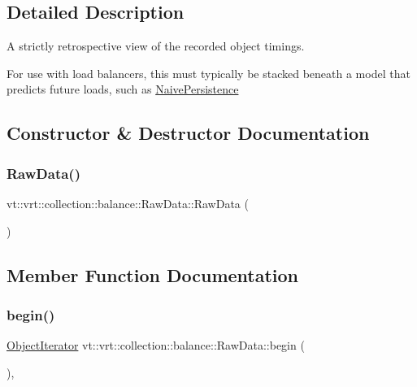 \subsection{Detailed Description}
A strictly retrospective view of the recorded object timings. 

For use with load balancers, this must typically be stacked beneath a model that predicts future loads, such as \hyperlink{structvt_1_1vrt_1_1collection_1_1balance_1_1_naive_persistence}{Naive\+Persistence} 

\subsection{Constructor \& Destructor Documentation}
\mbox{\label{structvt_1_1vrt_1_1collection_1_1balance_1_1_raw_data_a4879ed47b7d3da3008dc6199adc6d519}} 
\subsubsection{\texorpdfstring{Raw\+Data()}{RawData()}}
{\footnotesize\ttfamily vt\+::vrt\+::collection\+::balance\+::\+Raw\+Data\+::\+Raw\+Data (\begin{DoxyParamCaption}{ }\end{DoxyParamCaption})\hspace{0.3cm}{\ttfamily [default]}}



\subsection{Member Function Documentation}
\mbox{\label{structvt_1_1vrt_1_1collection_1_1balance_1_1_raw_data_a54351249212ade8b2d25a857e71b256f}} 
\subsubsection{\texorpdfstring{begin()}{begin()}}
{\footnotesize\ttfamily \hyperlink{structvt_1_1vrt_1_1collection_1_1balance_1_1_object_iterator}{Object\+Iterator} vt\+::vrt\+::collection\+::balance\+::\+Raw\+Data\+::begin (\begin{DoxyParamCaption}{ }\end{DoxyParamCaption})\hspace{0.3cm}{\ttfamily [override]}, {\ttfamily [virtual]}}

